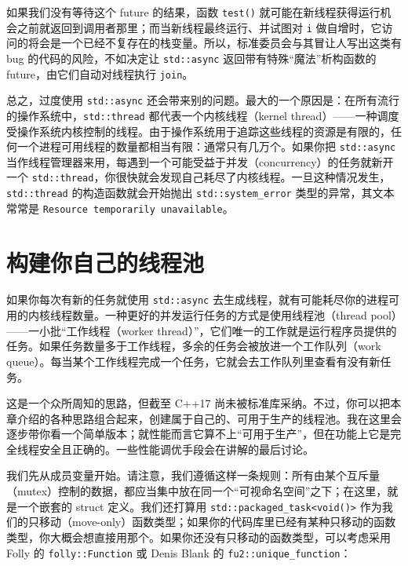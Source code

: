 如果我们没有等待这个 future 的结果，函数 \texttt{test(\allowbreak{})\allowbreak{}} 就可能在新线程获得运行机会之前就返回到调用者那里；而当新线程最终运行、并试图对 \texttt{i} 做自增时，它访问的将会是一个已经不复存在的栈变量。所以，标准委员会与其冒让人写出这类有 bug 的代码的风险，不如决定让 \texttt{std::\allowbreak{}async} 返回带有特殊“魔法”析构函数的 future，由它们自动对线程执行 \texttt{join}。

总之，过度使用 \texttt{std::\allowbreak{}async} 还会带来别的问题。最大的一个原因是：在所有流行的操作系统中，\texttt{std::\allowbreak{}thread} 都代表一个内核线程（kernel thread）——一种调度受操作系统内核控制的线程。由于操作系统用于追踪这些线程的资源是有限的，任何一个进程可用线程的数量都相当有限：通常只有几万个。如果你把 \texttt{std::\allowbreak{}async} 当作线程管理器来用，每遇到一个可能受益于并发（concurrency）的任务就新开一个 \texttt{std::\allowbreak{}thread}，你很快就会发现自己耗尽了内核线程。一旦这种情况发生，\texttt{std::\allowbreak{}thread} 的构造函数就会开始抛出 \texttt{std::\allowbreak{}system\_\allowbreak{}error} 类型的异常，其文本常常是 \texttt{Resource temporarily unavailable}。

\section{构建你自己的线程池}

如果你每次有新的任务就使用 \texttt{std::\allowbreak{}async} 去生成线程，就有可能耗尽你的进程可用的内核线程数量。一种更好的并发运行任务的方式是使用线程池（thread pool）——一小批“工作线程（worker thread）”，它们唯一的工作就是运行程序员提供的任务。如果任务数量多于工作线程，多余的任务会被放进一个工作队列（work queue）。每当某个工作线程完成一个任务，它就会去工作队列里查看有没有新任务。

这是一个众所周知的思路，但截至 C++17 尚未被标准库采纳。不过，你可以把本章介绍的各种思路组合起来，创建属于自己的、可用于生产的线程池。我在这里会逐步带你看一个简单版本；就性能而言它算不上“可用于生产”，但在功能上它是完全线程安全且正确的。一些性能调优手段会在讲解的最后讨论。

我们先从成员变量开始。请注意，我们遵循这样一条规则：所有由某个互斥量（mutex）控制的数据，都应当集中放在同一个“可视命名空间”之下；在这里，就是一个嵌套的 struct 定义。我们还打算用 \texttt{std::\allowbreak{}packaged\_\allowbreak{}task<\allowbreak{}void(\allowbreak{})\allowbreak{}>} 作为我们的只移动（move-only）函数类型；如果你的代码库里已经有某种只移动的函数类型，你大概会想直接用那个。如果你还没有只移动的函数类型，可以考虑采用 Folly 的 \texttt{folly::\allowbreak{}Function} 或 Denis Blank 的 \texttt{fu2::\allowbreak{}unique\_\allowbreak{}function}：

